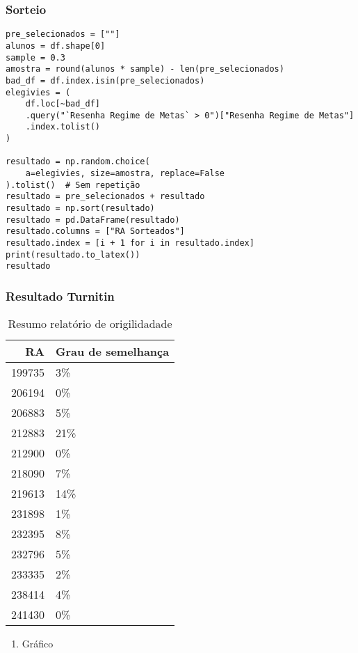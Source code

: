 \documentclass[11pt]{article}
\begin{document}
\subsubsection{Sorteio}
\label{sec:org90c7886}

\begin{verbatim}
pre_selecionados = [""]
alunos = df.shape[0]
sample = 0.3
amostra = round(alunos * sample) - len(pre_selecionados)
bad_df = df.index.isin(pre_selecionados)
elegivies = (
    df.loc[~bad_df]
    .query("`Resenha Regime de Metas` > 0")["Resenha Regime de Metas"]
    .index.tolist()
)

resultado = np.random.choice(
    a=elegivies, size=amostra, replace=False
).tolist()  # Sem repetição
resultado = pre_selecionados + resultado
resultado = np.sort(resultado)
resultado = pd.DataFrame(resultado)
resultado.columns = ["RA Sorteados"]
resultado.index = [i + 1 for i in resultado.index]
print(resultado.to_latex())
resultado
\end{verbatim}


\subsubsection{Resultado Turnitin}
\label{sec:org19f06d3}

\begin{table}[htbp]
\caption{\label{TurnitinNCM}Resumo relatório de origilidadade}
\centering
\begin{tabular}{rl}
\hline
RA & Grau de semelhança\\
\hline
199735 & 3\%\\
206194 & 0\%\\
206883 & 5\%\\
212883 & 21\%\\
212900 & 0\%\\
218090 & 7\%\\
219613 & 14\%\\
231898 & 1\%\\
232395 & 8\%\\
232796 & 5\%\\
233335 & 2\%\\
238414 & 4\%\\
241430 & 0\%\\
\hline
\end{tabular}
\end{table}
\begin{enumerate}
\item Gráfico
\label{sec:org84e6884}
\end{enumerate}
\end{document}
